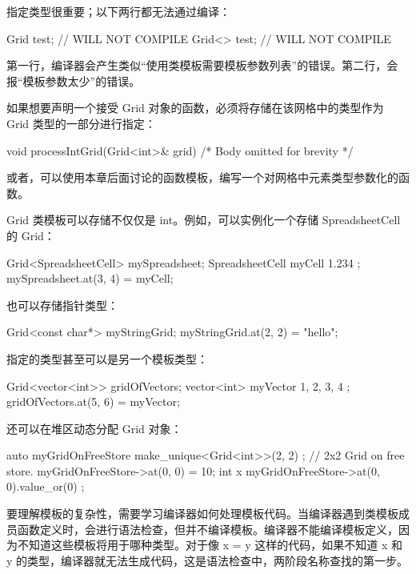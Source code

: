 指定类型很重要；以下两行都无法通过编译：

\begin{cpp}
Grid test; // WILL NOT COMPILE
Grid<> test; // WILL NOT COMPILE
\end{cpp}

第一行，编译器会产生类似“使用类模板需要模板参数列表”的错误。第二行，会报“模板参数太少”的错误。

如果想要声明一个接受 Grid 对象的函数，必须将存储在该网格中的类型作为 Grid 类型的一部分进行指定：

\begin{cpp}
void processIntGrid(Grid<int>& grid) { /* Body omitted for brevity */ }
\end{cpp}

或者，可以使用本章后面讨论的函数模板，编写一个对网格中元素类型参数化的函数。

Grid 类模板可以存储不仅仅是 int。例如，可以实例化一个存储 SpreadsheetCell 的 Grid：

\begin{cpp}
Grid<SpreadsheetCell> mySpreadsheet;
SpreadsheetCell myCell { 1.234 };
mySpreadsheet.at(3, 4) = myCell;
\end{cpp}

也可以存储指针类型：

\begin{cpp}
Grid<const char*> myStringGrid;
myStringGrid.at(2, 2) = "hello";
\end{cpp}

指定的类型甚至可以是另一个模板类型：

\begin{cpp}
Grid<vector<int>> gridOfVectors;
vector<int> myVector { 1, 2, 3, 4 };
gridOfVectors.at(5, 6) = myVector;
\end{cpp}

还可以在堆区动态分配 Grid 对象：

\begin{cpp}
auto myGridOnFreeStore { make_unique<Grid<int>>(2, 2) }; // 2x2 Grid on free store.
myGridOnFreeStore->at(0, 0) = 10;
int x { myGridOnFreeStore->at(0, 0).value_or(0) };
\end{cpp}



要理解模板的复杂性，需要学习编译器如何处理模板代码。当编译器遇到类模板成员函数定义时，会进行语法检查，但并不编译模板。编译器不能编译模板定义，因为不知道这些模板将用于哪种类型。对于像 x = y 这样的代码，如果不知道 x 和 y 的类型，编译器就无法生成代码，这是语法检查中，两阶段名称查找的第一步。

